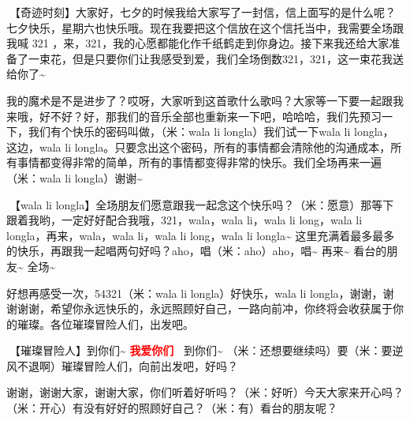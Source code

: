 \documentclass[
]{book}
\begin{document}
🎵【奇迹时刻】大家好，七夕的时候我给大家写了一封信，信上面写的是什么呢？七夕快乐，星期六也快乐哦。现在我要把这个信放在这个信托当中，我需要全场跟我喊 321 ，来，321，我的心愿都能化作千纸鹤走到你身边。接下来我还给大家准备了一束花，但是只要你们让我感受到爱，我们全场倒数321，321，这一束花我送给你了\textasciitilde{}

我的魔术是不是进步了？哎呀，大家听到这首歌什么歌吗？大家等一下要一起跟我来哦，好不好？好，那我们的音乐全部也重新来一下吧，哈哈哈，我们先预习一下，我们有个快乐的密码叫做，（米：wala li longla）我们试一下wala li longla，这边，wala li longla。只要念出这个密码，所有的事情都会清除他的沟通成本，所有事情都变得非常的简单，所有的事情都变得非常的快乐。我们全场再来一遍（米：wala li longla）谢谢\textasciitilde{}

🎵【wala li longla】全场朋友们愿意跟我一起念这个快乐吗？（米：愿意）那等下跟着我哟，一定好好配合我哦，321，wala，wala li，wala li long，wala li longla，再来，wala，wala li，wala li long，wala li longla\textasciitilde{} 这里充满着最多最多的快乐，再跟我一起唱两句好吗？aho，唱（米：aho）aho，唱\textasciitilde{} 再来\textasciitilde{} 看台的朋友\textasciitilde{} 全场\textasciitilde{}

好想再感受一次，54321（米：wala li longla）好快乐，wala li longla，谢谢，谢谢谢谢，希望你永远快乐的，永远照顾好自己，一路向前冲，你终将会收获属于你的璀璨。各位璀璨冒险人们，出发吧。

🎵【璀璨冒险人】到你们\textasciitilde{} \textbf{\textcolor{red}{我爱你们~} } 到你们\textasciitilde{} （米：还想要继续吗）要（米：要逆风不退啊）璀璨冒险人们，向前出发吧，好吗？

谢谢，谢谢大家，谢谢大家，你们听着好听吗？（米：好听）今天大家来开心吗？（米：开心）有没有好好的照顾好自己？（米：有）看台的朋友呢？
\end{document}

